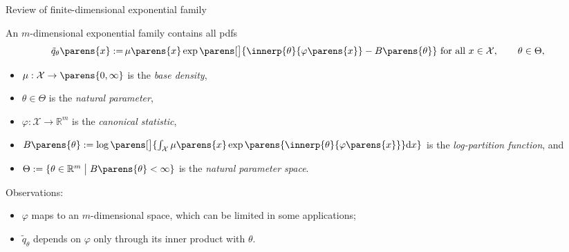 \documentclass[aspectratio=169,xcolor=dvipsnames]{beamer}
\begin{document}
\begin{frame}{Review of finite-dimensional exponential family}
	
	An $m$-dimensional exponential family 
	contains all pdfs %
	\begin{align}
		\tilde{q}_{\theta} \parens{x} := & \, \mu \parens{x} \exp \parens[\big]{ \innerp{\theta}{\varphi \parens{x}}
		- B \parens{\theta}} \text{ for all } x \in \mathcal{X}, \qquad \theta \in \Theta, 
	\end{align}
	\vspace{-15pt}
	\begin{itemize}
		\item $\mu: \mathcal{X} \to \parens{0, \infty}$ is the \textit{base density}, 
		\item $\theta \in \Theta$ is the \textit{natural parameter}, 
		\item $\varphi: \mathcal{X} \to \mathbb{R}^m$ is the \textit{canonical statistic}, %
		\item $B \parens{\theta} := \log \parens[\big]{\int_{\mathcal{X}} \mu \parens{x} \exp \parens{\innerp{\theta}{\varphi \parens{x}}} \mathrm{d} x}$ is the \textit{log-partition function}, and 
		\item $\Theta := \{\theta \in \mathbb{R}^m \bigm| B \parens{\theta} < \infty \}$ is the \textit{natural parameter space}. 
	\end{itemize}
	
	\vspace{10pt}
	
	{\color{defaultcolor}Observations:}
	\begin{itemize}
		\item $\varphi$ maps to an $m$-dimensional space, which can be limited in some applications; 
		\item $\tilde{q}_{\theta}$ depends on $\varphi$ only through its inner product with $\theta$. 
	\end{itemize}
	
		
	
\end{frame}
\end{document}

